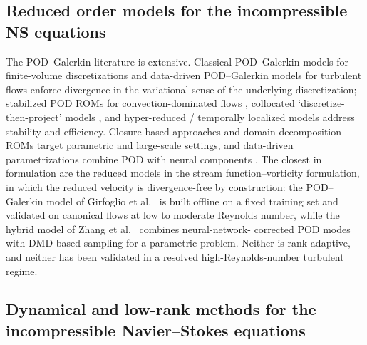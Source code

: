 \subsection{Reduced order models for the incompressible NS equations}
\label{sec:related:rom}

The POD--Galerkin literature is extensive. Classical POD--Galerkin models for
finite-volume discretizations \cite{loorenzi2016} and data-driven
POD--Galerkin models for turbulent flows \cite{hijazi2020} enforce
divergence in the variational sense of the underlying discretization;
stabilized POD ROMs for convection-dominated flows \cite{siena2024},
collocated `discretize-then-project' models \cite{star2021}, and
hyper-reduced / temporally localized models \cite{klein2023} address
stability and efficiency. Closure-based approaches
\cite{prakash2024} and domain-decomposition ROMs \cite{prusak2023} target
parametric and large-scale settings, and data-driven parametrizations combine
POD with neural components \cite{kim2023,kochkov2021}. The closest in formulation are the reduced models in the stream
function--vorticity formulation, in which the reduced velocity is
divergence-free by construction: the POD--Galerkin model of Girfoglio
et al.~\cite{girfoglio2022pod} is built offline on a fixed training set and
validated on canonical flows at low to moderate Reynolds number, while the
hybrid model of Zhang et al.~\cite{zhang2024} combines neural-network-
corrected POD modes with DMD-based sampling for a parametric problem. Neither
is rank-adaptive, and neither has been validated in a resolved
high-Reynolds-number turbulent regime.

\subsection{Dynamical and low-rank methods for the incompressible Navier--Stokes equations}
\label{sec:related:ns}


